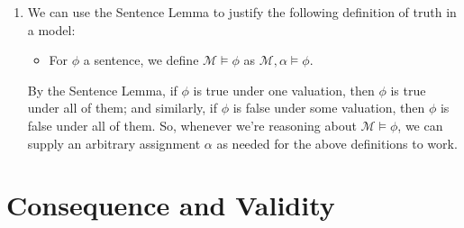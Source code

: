 \begin{enumerate}[\thesection.1]
\begin{proof}
\begin{enumerate}[(i)]
\begin{enumerate}[(a)]
\begin{itemize}
			  \item  From $\llbracket\forall y\phi\rrbracket_\alpha^\mathcal{M}=0$,
				it follows that for some
				$d\in D^\mathcal{M}$
				we have
				$\mathcal{M},\alpha[y\mapsto d]\nvDash\phi$.
				For this $d$,
				consider
				$\beta[y\mapsto d]$.
				Since
				$\alpha(x)=\beta(x)$
				for all $x\in V$,
				we have that
				$\alpha[y\mapsto d](x)=\beta[y\mapsto d](x)$
				for all $x\in V$.
				Moreover,
				$\alpha[y\mapsto d](y)=d=\beta[y\mapsto d](y)$.
				Hence
				$\alpha[y\mapsto d](x)=\beta[y\mapsto d](x)$
				for all
				$x\in V\cup\{y\}$.
				But by the induction hypothesis, this means that
				$\llbracket\phi\rrbracket_{\alpha[y\mapsto d]}^\mathcal{M}=\llbracket\phi\rrbracket_{\beta[y\mapsto d]}^\mathcal{M}=0$.
				So,
				$\llbracket\forall y\phi\rrbracket_\beta^\mathcal{M}=0$,
				as desired.
				
			\end{itemize}
			
			\end{enumerate}
		
		\end{enumerate}
		This concludes our induction.
		\end{proof}
		The Sentence Lemma is a simple corollary of the Formula Locality Lemma.
		
		\item We can use the Sentence Lemma to justify the following definition of truth in a model:
		
		\begin{itemize}
		
			\item For $\phi$ a sentence, we define $\mathcal{M}\vDash\phi$ as $\mathcal{M},\alpha\vDash\phi$.
		
		\end{itemize}
		
		By the Sentence Lemma, if $\phi$ is true under one valuation, then $\phi$ is true under all of them; and similarly, if $\phi$ is false under some valuation, then $\phi$ is false under all of them. So, whenever we're reasoning about $\mathcal{M}\vDash\phi$, we can supply an arbitrary assignment $\alpha$ as needed for the above definitions to work.
				
	\end{enumerate}


\section{Consequence and Validity}


